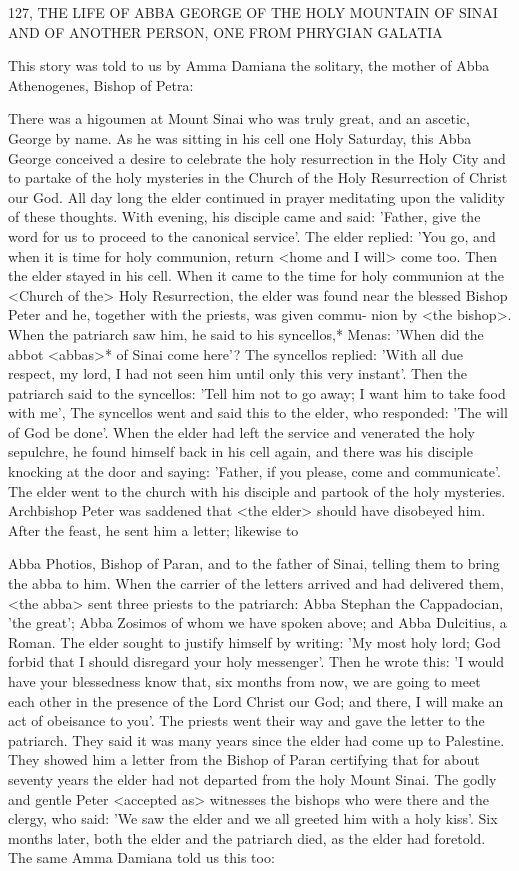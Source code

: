 127, THE LIFE OF ABBA GEORGE
OF THE HOLY MOUNTAIN
OF SINAI AND OF ANOTHER PERSON,
ONE FROM PHRYGIAN GALATIA

This story was told to us by Amma Damiana the solitary, the
mother of Abba Athenogenes, Bishop of Petra:

There was a higoumen at Mount Sinai who was truly great, and an
ascetic, George by name. As he was sitting in his cell one Holy
Saturday, this Abba George conceived a desire to celebrate the holy
resurrection in the Holy City and to partake of the holy mysteries
in the Church of the Holy Resurrection of Christ our God. All day
long the elder continued in prayer meditating upon the validity of
these thoughts. With evening, his disciple came and said: 'Father,
give the word for us to proceed to the canonical service'. The elder
replied: 'You go, and when it is time for holy communion, return
<home and I will> come too. Then the elder stayed in his cell.
When it came to the time for holy communion at the <Church of
the> Holy Resurrection, the elder was found near the blessed
Bishop Peter and he, together with the priests, was given commu-
nion by <the bishop>. When the patriarch saw him, he said to his
syncellos,* Menas: 'When did the abbot <abbas>* of Sinai come
here'? The syncellos replied: 'With all due respect, my lord, I had
not seen him until only this very instant'. Then the patriarch said to
the syncellos: 'Tell him not to go away; I want him to take food
with me', The syncellos went and said this to the elder, who
responded: 'The will of God be done'. When the elder had left the
service and venerated the holy sepulchre, he found himself back in
his cell again, and there was his disciple knocking at the door and
saying: 'Father, if you please, come and communicate'. The elder
went to the church with his disciple and partook of the holy
mysteries. Archbishop Peter was saddened that <the elder> should
have disobeyed him. After the feast, he sent him a letter; likewise to

Abba Photios, Bishop of Paran, and to the father of Sinai, telling
them to bring the abba to him. When the carrier of the letters
arrived and had delivered them, <the abba> sent three priests to the
patriarch: Abba Stephan the Cappadocian, 'the great'; Abba
Zosimos of whom we have spoken above; and Abba Dulcitius, a
Roman. The elder sought to justify himself by writing: 'My most
holy lord; God forbid that I should disregard your holy messenger'.
Then he wrote this: 'I would have your blessedness know that, six
months from now, we are going to meet each other in the presence
of the Lord Christ our God; and there, I will make an act of
obeisance to you'. The priests went their way and gave the letter to
the patriarch. They said it was many years since the elder had come
up to Palestine. They showed him a letter from the Bishop of Paran
certifying that for about seventy years the elder had not departed
from the holy Mount Sinai. The godly and gentle Peter <accepted
as> witnesses the bishops who were there and the clergy, who said:
'We saw the elder and we all greeted him with a holy kiss'. Six
months later, both the elder and the patriarch died, as the elder had
foretold.
The same Amma Damiana told us this too:

